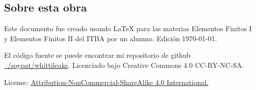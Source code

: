 


 
	\frontmatter

\pagestyle{plain}
\tableofcontents
\clearpage
\vspace{1cm}
\subsection*{Sobre esta obra}
Este documento fue creado usando \LaTeX{} para las materias Elementos Finitos I y Elementos Finitos II del ITBA por un alumno. Edición \today.

El código fuente se puede encontrar mi repositorio de github \href{https://github.com/soypat/whittileaks}{~/soypat/whittileaks}. Licenciado bajo Creative Commons 4.0 CC-BY-NC-SA.

License: \href{https://creativecommons.org/licenses/by-nc-sa/4.0/}{Attribution-NonCommercial-ShareAlike 4.0 International.} 
\lstlistoflistings

\mainmatter


\setcounter{section}{-1}









\clearpage

